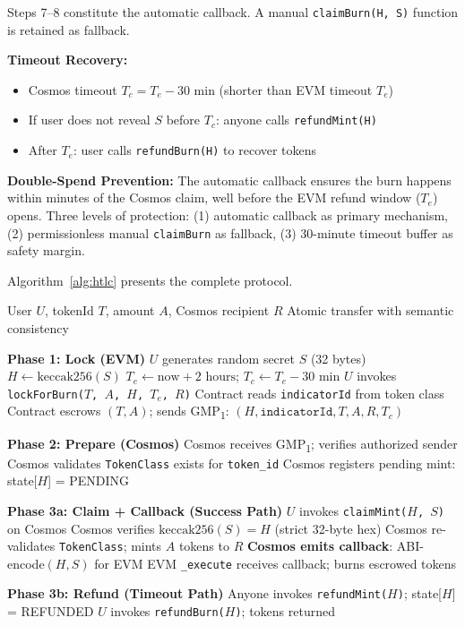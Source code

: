 \documentclass[conference,10pt]{IEEEtran}
\begin{document}
Steps 7--8 constitute the automatic callback. A manual \texttt{claimBurn(H, S)} function is retained as fallback.

\textbf{Timeout Recovery:}
\begin{itemize}
    \item Cosmos timeout $T_c = T_e - 30$ min (shorter than EVM timeout $T_e$)
    \item If user does not reveal $S$ before $T_c$: anyone calls \texttt{refundMint(H)}
    \item After $T_e$: user calls \texttt{refundBurn(H)} to recover tokens
\end{itemize}

\textbf{Double-Spend Prevention:} The automatic callback ensures the burn happens within minutes of the Cosmos claim, well before the EVM refund window ($T_e$) opens. Three levels of protection: (1) automatic callback as primary mechanism, (2) permissionless manual \texttt{claimBurn} as fallback, (3) 30-minute timeout buffer as safety margin.

Algorithm~\ref{alg:htlc} presents the complete protocol.

\begin{algorithm}[t]
\caption{HTLC Atomic Transfer with Automatic Callback}
\label{alg:htlc}
\begin{algorithmic}[1]
\Require User $U$, tokenId $T$, amount $A$, Cosmos recipient $R$
\Ensure Atomic transfer with semantic consistency

\Statex \textbf{Phase 1: Lock (EVM)}
\State $U$ generates random secret $S$ (32 bytes)
\State $H \gets \text{keccak256}(S)$
\State $T_e \gets \text{now} + 2\text{ hours}$; $T_c \gets T_e - 30\text{ min}$
\State $U$ invokes \texttt{lockForBurn($T$, $A$, $H$, $T_e$, $R$)}
\State Contract reads \texttt{indicatorId} from token class
\State Contract escrows $(T, A)$; sends GMP\textsubscript{1}: $(H, \texttt{indicatorId}, T, A, R, T_c)$

\Statex \textbf{Phase 2: Prepare (Cosmos)}
\State Cosmos receives GMP\textsubscript{1}; verifies authorized sender
\State Cosmos validates \texttt{TokenClass} exists for \texttt{token\_id}
\State Cosmos registers pending mint: state[$H$] = PENDING

\Statex \textbf{Phase 3a: Claim + Callback (Success Path)}
\State $U$ invokes \texttt{claimMint($H$, $S$)} on Cosmos
\State Cosmos verifies $\text{keccak256}(S) = H$ (strict 32-byte hex)
\State Cosmos re-validates \texttt{TokenClass}; mints $A$ tokens to $R$
\State \textbf{Cosmos emits callback}: ABI-encode$(H, S)$ for EVM
\State EVM \texttt{\_execute} receives callback; burns escrowed tokens

\Statex \textbf{Phase 3b: Refund (Timeout Path)}
    \State Anyone invokes \texttt{refundMint($H$)}; state[$H$] = REFUNDED
\EndIf
{}
    \State $U$ invokes \texttt{refundBurn($H$)}; tokens returned
\EndIf
\end{algorithmic}
\end{algorithm}
\end{document}

